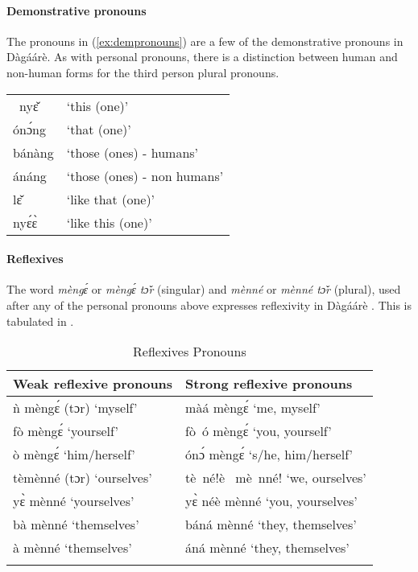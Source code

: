 \begin{refsection}
\paragraph{ Demonstrative pronouns}

The pronouns in (\ref{ex:dempronouns}) are a few of the demonstrative pronouns in Dàgáárè. As
with personal pronouns, there is a distinction between human and non-human forms for the
third person plural pronouns.

\ea \label{ex:dempronouns} \begin{tabular}{ll} \ nyɛ̌& ‘this (one)’\\
ónɔ́ng& ‘that (one)’\\
bánàng &‘those (ones) - humans’\\
ánáng &‘those (ones) - non humans’\\
lɛ̌ &‘like that (one)’\\
nyɛ́ɛ̀ &‘like this (one)’
\end{tabular}
\z 


\paragraph{ Reflexives}
The word \textit{mèngɛ́} or \textit{mèngɛ́ tɔ̌r} (singular) and \textit{mènné} or \textit{mènné tɔ̌r} (plural), used
after any of the personal pronouns above expresses reflexivity in Dàgáárè . This is tabulated
in .

\begin{table}[]
    \centering
    \begin{tabular}{ll}\lsptoprule
Weak reflexive pronouns &  Strong reflexive pronouns \\\midrule
ǹ mèngɛ́ (tɔr) ‘myself’     & màá mèngɛ́ ‘me, myself’\\
fò mèngɛ́  ‘yourself’&fò~ó mèngɛ́ ‘you, yourself’\\
ò mèngɛ́  ‘him/herself’ &  ónɔ́ mèngɛ́ ‘s/he, him/herself’\\
tèmènné (tɔr) ‘ourselves’ &    tè~né!è~ mè~nné! ‘we, ourselves'\\
yɛ̀ mènné ‘yourselves’& yɛ̀ néè mènné ‘you, yourselves'\\
bà mènné ‘themselves’& báná mènné ‘they, themselves’ \\
à mènné ‘themselves’&áná mènné ‘they, themselves’\\\lspbottomrule
    \end{tabular}
    \caption{Reflexives Pronouns}
    \label{tab:reflexives}
\end{table}  



\end{refsection}
